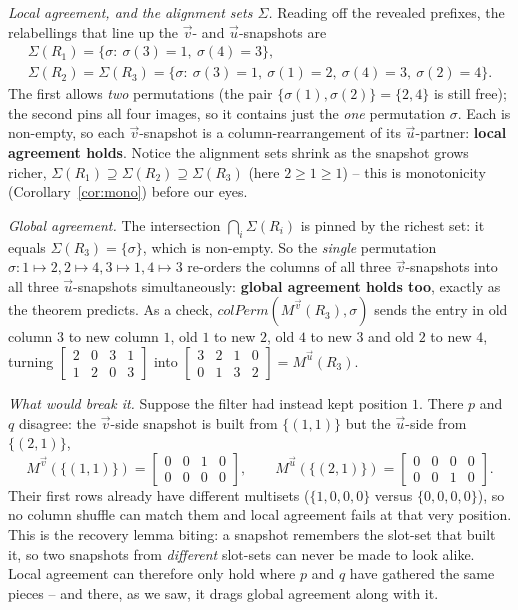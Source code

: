 \documentclass{article}
\begin{document}
\medskip\noindent\emph{Local agreement, and the alignment sets $\Sigma$.}
Reading off the revealed prefixes, the relabellings that line up the $\vec v$- and
$\vec u$-snapshots are
\begin{gather*}
\Sigma(R_1)=\{\sigma:\ \sigma(3)=1,\ \sigma(4)=3\},\\
\Sigma(R_2)=\Sigma(R_3)=\{\sigma:\ \sigma(3)=1,\ \sigma(1)=2,\ \sigma(4)=3,\ \sigma(2)=4\}.
\end{gather*}
The first allows \emph{two} permutations (the pair $\{\sigma(1),\sigma(2)\}=\{2,4\}$
is still free); the second pins all four images, so it contains just the \emph{one}
permutation $\sigma$.
Each is non-empty, so each $\vec v$-snapshot is a column-rearrangement of its
$\vec u$-partner: \textbf{local agreement holds}.  Notice the alignment sets shrink
as the snapshot grows richer,
$\Sigma(R_1)\supseteq\Sigma(R_2)\supseteq\Sigma(R_3)$ (here $2\ge1\ge1$) -- this is
monotonicity (Corollary~\ref{cor:mono}) before our eyes.

\medskip\noindent\emph{Global agreement.}
The intersection $\bigcap_i\Sigma(R_i)$ is pinned by the richest set: it equals
$\Sigma(R_3)=\{\sigma\}$, which is non-empty.  So the \emph{single} permutation
$\sigma:1\mapsto2,2\mapsto4,3\mapsto1,4\mapsto3$ re-orders the columns of all three
$\vec v$-snapshots into all three $\vec u$-snapshots simultaneously:
\textbf{global agreement holds too}, exactly as the theorem predicts.  As a check,
$colPerm(M^{\vec v}(R_3),\sigma)$ sends the entry in old column $3$ to new column
$1$, old $1$ to new $2$, old $4$ to new $3$ and old $2$ to new $4$, turning
$\left[\begin{smallmatrix}2&0&3&1\\1&2&0&3\end{smallmatrix}\right]$ into
$\left[\begin{smallmatrix}3&2&1&0\\0&1&3&2\end{smallmatrix}\right]=M^{\vec u}(R_3)$.

\medskip\noindent\emph{What would break it.}
Suppose the filter had instead kept position $1$.  There $p$ and $q$ disagree: the
$\vec v$-side snapshot is built from $\{(1,1)\}$ but the $\vec u$-side from
$\{(2,1)\}$,
\[
M^{\vec v}(\{(1,1)\})=\begin{bmatrix}0&0&1&0\\0&0&0&0\end{bmatrix},
\qquad
M^{\vec u}(\{(2,1)\})=\begin{bmatrix}0&0&0&0\\0&0&1&0\end{bmatrix}.
\]
Their first rows already have different multisets ($\{1,0,0,0\}$ versus
$\{0,0,0,0\}$), so no column shuffle can match them and local agreement fails at
that very position.  This is the recovery lemma biting: a snapshot remembers the
slot-set that built it, so two snapshots from \emph{different} slot-sets can never
be made to look alike.  Local agreement can therefore only hold where $p$ and $q$
have gathered the same pieces -- and there, as we saw, it drags global agreement
along with it.
\end{document}
